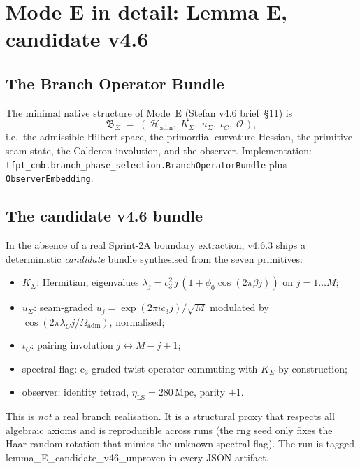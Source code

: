 \section{Mode E in detail: Lemma E, candidate v4.6}
\label{sec:modeE}

\subsection{The Branch Operator Bundle}

The minimal native structure of Mode~E (Stefan v4.6 brief~\S11) is
\begin{equation}
\mathfrak B_\Sigma \;=\; (\,
\mathcal H_{\mathrm{adm}},\;
K_\Sigma,\;
u_\Sigma,\;
\iota_C,\;
\mathcal O\,) ,
\end{equation}
i.e.\ the admissible Hilbert space, the primordial-curvature Hessian,
the primitive seam state, the Calderon involution, and the observer.
Implementation: \texttt{tfpt\_cmb.branch\_phase\_selection.BranchOperatorBundle}
plus \texttt{ObserverEmbedding}.

\subsection{The candidate v4.6 bundle}

In the absence of a real Sprint-2A boundary extraction, v4.6.3 ships
a deterministic \emph{candidate} bundle synthesised from the seven
primitives:
\begin{itemize}[leftmargin=1.4em]
\item \(K_\Sigma\): Hermitian, eigenvalues
\(\lambda_j = c_3^2\,j\,(1+\phi_0\cos(2\pi\beta j))\) on \(j=1\dots M\);
\item \(u_\Sigma\): seam-graded
\(u_j = \exp(2\pi i c_3 j)/\sqrt M\) modulated by
\(\cos(2\pi\lambda_C j/\Omega_{\mathrm{adm}})\), normalised;
\item \(\iota_C\): pairing involution \(j\leftrightarrow M-j+1\);
\item spectral flag: c\(_3\)-graded twist operator commuting with
\(K_\Sigma\) by construction;
\item observer: identity tetrad, \(\eta_{\mathrm{LS}}=280\,\mathrm{Mpc}\),
parity \(+1\).
\end{itemize}
This is \emph{not} a real branch realisation. It is a structural
proxy that respects all algebraic axioms and is reproducible across
runs (the rng seed only fixes the Haar-random rotation that mimics
the unknown spectral flag).  The run is tagged
\textsf{lemma\_E\_candidate\_v46\_unproven} in every JSON artifact.

